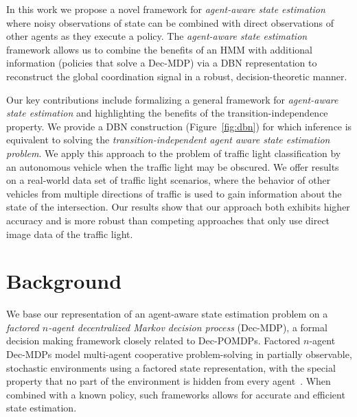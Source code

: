 \documentclass[letterpaper,10pt,conference]{ieeeconf}
\begin{document}
In this work we propose a novel framework for \emph{agent-aware state estimation} where noisy observations of state can be combined with direct observations of other agents as they execute a policy. The \emph{agent-aware state estimation} framework allows us to combine the benefits of an HMM with additional information (policies that solve a Dec-MDP) via a DBN representation to reconstruct the global coordination signal in a robust, decision-theoretic manner.

Our key contributions include formalizing a general framework for \emph{agent-aware state estimation} and highlighting the benefits of the transition-independence property. We provide a DBN construction (Figure~\ref{fig:dbn}) for which inference is equivalent to solving the \emph{transition-independent agent aware state estimation problem}. We apply this approach to the problem of traffic light classification by an autonomous vehicle when the traffic light may be obscured. We offer results on a real-world data set of traffic light scenarios, where the behavior of other vehicles from multiple directions of traffic is used to gain information about the state of the intersection. Our results show that our approach both exhibits higher accuracy and is more robust than competing approaches that only use direct image data of the traffic light.

\section{Background}

We base our representation of an agent-aware state estimation problem on a \emph{factored $n$-agent decentralized Markov decision process} (Dec-MDP), a formal decision making framework closely related to Dec-POMDPs. Factored $n$-agent Dec-MDPs model multi-agent cooperative problem-solving in partially observable, stochastic environments using a factored state representation, with the special property that no part of the environment is hidden from every agent~\cite{bernstein2002complexity,amato2013decentralized}. When combined with a known policy, such frameworks allows for accurate and efficient state estimation.
\end{document}

